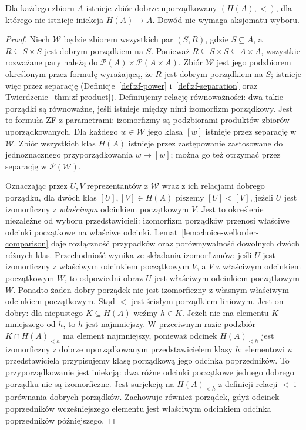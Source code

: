 \begin{twierdzenie}\label{thm:choice-hartogs}
Dla każdego zbioru $A$ istnieje zbiór dobrze uporządkowany
$(H(A),<)$, dla którego nie istnieje iniekcja $H(A)\to A$.
Dowód nie wymaga aksjomatu wyboru.
\end{twierdzenie}
\begin{proof}
Niech $\mathcal W$ będzie zbiorem wszystkich par $(S,R)$,
gdzie $S\subseteq A$, a $R\subseteq S\times S$ jest dobrym
porządkiem na $S$. Ponieważ $R\subseteq S\times S\subseteq A\times A$,
wszystkie rozważane pary należą do
$\mathcal P(A)\times\mathcal P(A\times A)$.
Zbiór $\mathcal W$ jest jego podzbiorem określonym
przez formułę wyrażającą, że $R$ jest dobrym porządkiem na $S$;
istnieje więc przez separację
(Definicje~\ref{def:zf-power} i~\ref{def:zf-separation}
oraz Twierdzenie~\ref{thm:zf-product}).
Definiujemy relację równoważności: dwa takie porządki
są równoważne, jeśli istnieje między nimi izomorfizm
porządkowy. Jest to formuła ZF z parametrami:
izomorfizmy są podzbiorami produktów zbiorów uporządkowanych.
Dla każdego $w\in\mathcal W$ jego klasa $[w]$
istnieje przez separację w $\mathcal W$.
Zbiór wszystkich klas $H(A)$ istnieje przez zastępowanie
zastosowane do jednoznacznego przyporządkowania
$w\mapsto[w]$; można go też otrzymać przez separację
w $\mathcal P(\mathcal W)$.

Oznaczając przez $U,V$ reprezentantów z $\mathcal W$
wraz z ich relacjami dobrego porządku, dla dwóch klas
$[U],[V]\in H(A)$ piszemy $[U]<[V]$,
jeżeli $U$ jest izomorficzny z \emph{właściwym} odcinkiem
początkowym $V$. Jest to określenie niezależne
od wyboru przedstawicieli: izomorfizm porządków przenosi
właściwe odcinki początkowe na właściwe odcinki.
Lemat~\ref{lem:choice-wellorder-comparison} daje rozłączność
przypadków oraz porównywalność dowolnych dwóch różnych klas.
Przechodniość wynika ze składania izomorfizmów:
jeśli $U$ jest izomorficzny z właściwym odcinkiem
początkowym $V$, a $V$ z właściwym odcinkiem
początkowym $W$, to odpowiedni obraz $U$
jest właściwym odcinkiem początkowym $W$.
Ponadto żaden dobry porządek nie jest izomorficzny
z własnym właściwym odcinkiem początkowym.
Stąd $<$ jest ścisłym porządkiem liniowym.
Jest on dobry: dla niepustego $K\subseteq H(A)$ weźmy $h\in K$.
Jeżeli nie ma elementu $K$ mniejszego od $h$, to $h$
jest najmniejszy. W przeciwnym razie podzbiór
$K\cap H(A)_{<h}$ ma element najmniejszy, ponieważ
odcinek $H(A)_{<h}$ jest izomorficzny z dobrze
uporządkowanym przedstawicielem klasy $h$:
elementowi $u$ przedstawiciela przypisujemy klasę
porządkową jego odcinka poprzedników. To przyporządkowanie
jest iniekcją: dwa różne odcinki początkowe jednego
dobrego porządku nie są izomorficzne. Jest surjekcją
na $H(A)_{<h}$ z definicji relacji $<$ i porównania
dobrych porządków. Zachowuje również porządek, gdyż
odcinek poprzedników wcześniejszego elementu jest
właściwym odcinkiem odcinka poprzedników późniejszego.


\end{proof}
